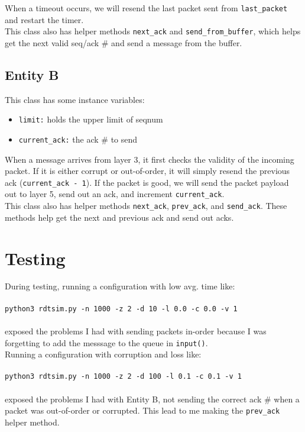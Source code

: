 \documentclass{article}
\begin{document}
\noindent When a timeout occurs, we will resend the last packet sent from \texttt{last\_packet} and restart the timer. \\

\noindent This class also has helper methods \texttt{next\_ack} and
\texttt{send\_from\_buffer}, which helps get the next valid seq/ack \# and send
a message from the buffer.

\subsection{Entity B}
This class has some instance variables:
\begin{itemize}
\item \texttt{limit:} holds the upper limit of seqnum
\item \texttt{current\_ack:} the ack \# to send
\end{itemize}
\noindent When a message arrives from layer 3, it first checks the validity of the
incoming packet. If it is either corrupt or out-of-order, it will simply resend
the previous ack (\texttt{current\_ack - 1}). If the packet is good, we will
send the packet payload out to layer 5, send out an ack, and increment
\texttt{current\_ack}. \\

\noindent This class also has helper methods \texttt{next\_ack}, \texttt{prev\_ack}, and
\texttt{send\_ack}. These methods help get the next and previous ack and send out acks.

\section{Testing}
During testing, running a configuration with low avg. time like: \\\\
\hspace*{10mm} \texttt{python3 rdtsim.py -n 1000 -z 2 -d 10 -l 0.0 -c 0.0 -v 1}
\\\\
\noindent exposed the problems I had with sending packets in-order because I was
forgetting to add the messsage to the queue in \texttt{input()}. \\

\noindent Running a configuration with corruption and loss like: \\\\
\hspace*{10mm} \texttt{python3 rdtsim.py -n 1000 -z 2 -d 100 -l 0.1 -c 0.1 -v 1}
\\\\
\noindent exposed the problems I had with Entity B, not sending the correct ack
\# when a packet was out-of-order or corrupted. This lead to me making the
\texttt{prev\_ack} helper method.
\end{document}

